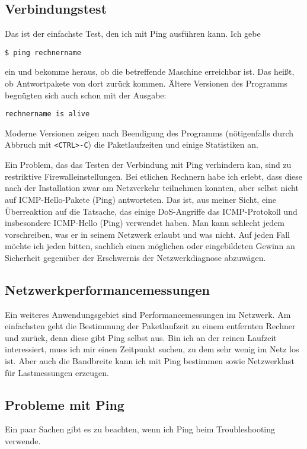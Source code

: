 \begin{normaltext}
  \subsection{Verbindungstest}
  Das ist der einfachste Test, den ich mit Ping ausführen kann. Ich gebe
  \begin{verbatim}
$ ping rechnername
  \end{verbatim}
  ein und bekomme heraus, ob die betreffende Maschine erreichbar ist. Das
  heißt, ob Antwortpakete von dort zurück kommen. Ältere Versionen des
  Programms begnügten sich auch schon mit der Ausgabe:\
  \begin{verbatim}
rechnername is alive
  \end{verbatim}
  Moderne Versionen zeigen nach Beendigung des Programms (nötigenfalls durch
  Abbruch mit \verb?<CTRL>-C?) die Paketlaufzeiten und einige Statistiken an.

  Ein Problem, das das Testen der Verbindung mit Ping verhindern kan, sind zu
  restriktive Firewalleinstellungen. Bei etlichen Rechnern habe ich erlebt,
  dass diese nach der Installation zwar am Netzverkehr teilnehmen konnten,
  aber selbst nicht auf ICMP-Hello-Pakete (Ping) antworteten. Das ist, aus
  meiner Sicht, eine Überreaktion auf die Tatsache, das einige DoS-Angriffe
  das ICMP-Protokoll und insbesondere ICMP-Hello (Ping) verwendet haben. Man
  kann schlecht jedem vorschreiben, was er in seinem Netzwerk erlaubt und was
  nicht. Auf jeden Fall möchte ich jeden bitten, sachlich einen möglichen oder
  eingebildeten Gewinn an Sicherheit gegenüber der Erschwernis der
  Netzwerkdiagnose abzuwägen.

  \subsection{Netzwerkperformancemessungen}
  Ein weiteres Anwendungsgebiet sind Performancemessungen im Netzwerk. Am
  einfachsten geht die Bestimmung der Paketlaufzeit zu einem entfernten
  Rechner und zurück, denn diese gibt Ping selbst aus. Bin ich an der reinen
  Laufzeit interessiert, muss ich mir einen Zeitpunkt suchen, zu dem sehr
  wenig im Netz los ist. Aber auch die Bandbreite kann ich mit Ping bestimmen
  sowie Netzwerklast für Lastmessungen erzeugen.

  \subsection{Probleme mit Ping}
  Ein paar Sachen gibt es zu beachten, wenn ich Ping beim Troubleshooting
  verwende.


\end{normaltext}
